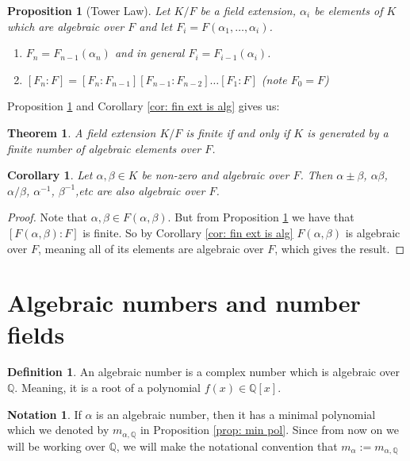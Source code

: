 \documentclass[11pt,a4paper]{report}
\theoremstyle{plain}
\newtheorem{thm}[subsection]{Theorem}
\newtheorem{cor}[subsection]{Corollary}
\newtheorem{prop}[subsection]{Proposition}
\theoremstyle{definition}
\newtheorem{defn}[subsection]{Definition}
\theoremstyle{definition}
\newtheorem{nota}[subsection]{Notation}
\def\QQ{\mathbb{Q}}
\def \a{\alpha}
\begin{document}
	\begin{prop}[Tower Law]\label{prop: tower law}Let $K/F$ be a field extension, $\a_i$ be elements of $K$ which are algebraic over $F$ and let $F_i=F(\a_1,\dots,\a_i)$.
		\begin{enumerate}
			\item $F_n=F_{n-1}(\a_n)$ and in general $F_i=F_{i-1}(\a_i)$.
			\item  $[F_n:F]=[F_n:F_{n-1}][F_{n-1}:F_{n-2}]\dots[F_1:F]$ (note $F_0=F$)
		\end{enumerate}
	\end{prop}
	
	Proposition \ref{prop: tower law} and Corollary \ref{cor: fin ext is alg} gives us:
	
	\begin{thm}\label{thm: fin ext iff alg}
		A field extension $K/F$ is finite if and only if $K$ is generated by a finite number of algebraic elements over $F$.
	\end{thm}
	
	\begin{cor}
		Let $\a,\beta \in K$ be non-zero and algebraic over $F$. Then $\a \pm \beta$, $\a\beta$, $\a/\beta$, $\a^{-1}$, $\beta^{-1}$,etc are also algebraic over $F$.
	\end{cor}
	\begin{proof}
		Note that $\a, \beta \in F(\a,\beta)$. But from Proposition \ref{prop: tower law} we have  that $[F(\a,\beta):F]$ is finite. So by Corollary \ref{cor: fin ext is alg} $F(\a,\beta)$ is algebraic over $F$, meaning all of its elements are algebraic over $F$, which gives the result.
	\end{proof}
	
	\section{Algebraic numbers and number fields}
	
	\begin{defn}
		An algebraic number is a complex number which is algebraic over $\QQ$. Meaning, it is a root of a polynomial $f(x) \in \QQ[x]$.
	\end{defn}
	
	\begin{nota}
		If $\a$ is an algebraic number, then it has a minimal polynomial which we denoted by $m_{\a,\QQ}$ in Proposition \ref{prop: min pol}. Since from now on we will be working over $\QQ$, we will make the notational convention that $m_{\a}:=m_{\a,\QQ}$
	\end{nota}
	
\end{document}
